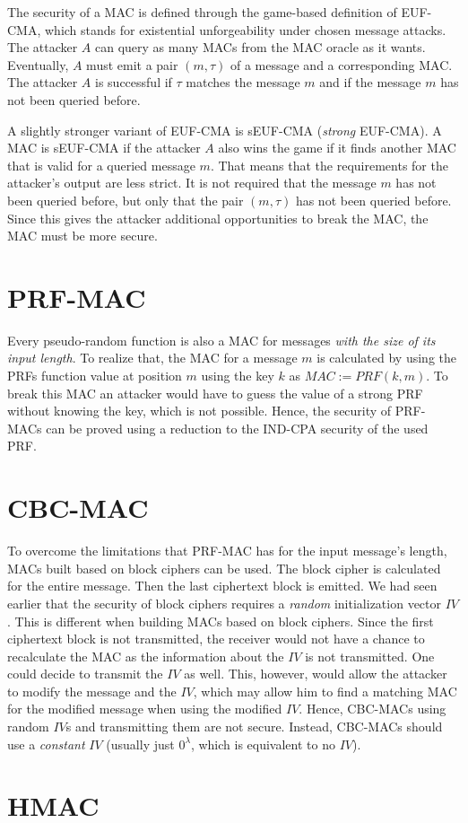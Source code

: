 The security of a \ac{MAC} is defined through the game-based definition of EUF-CMA, which stands for existential unforgeability under chosen message attacks. The attacker $A$ can query as many \acp{MAC} from the \ac{MAC} oracle as it wants. Eventually, $A$ must emit a pair $(m,\tau)$ of a message and a corresponding \ac{MAC}. The attacker $A$ is successful if $\tau$ matches the message $m$ and if the message $m$ has not been queried before.

A slightly stronger variant of EUF-CMA is sEUF-CMA (\emph{strong} EUF-CMA). A \ac{MAC} is sEUF-CMA if the attacker $A$ also wins the game if it finds another \ac{MAC} that is valid for a queried message $m$. That means that the requirements for the attacker's output are less strict. It is not required that the message $m$ has not been queried before, but only that the pair $(m,\tau)$ has not been queried before. Since this gives the attacker additional opportunities to break the \ac{MAC}, the \ac{MAC} must be more secure.

\section{PRF-MAC}

Every pseudo-random function is also a MAC for messages \emph{with the size of its input length}.
To realize that, the MAC for a message $m$ is calculated by using the PRFs function value at position $m$ using the key $k$ as $MAC := PRF(k,m)$.
To break this MAC an attacker would have to guess the value of a strong PRF without knowing the key, which is not possible.
Hence, the security of PRF-MACs can be proved using a reduction to the IND-CPA security of the used PRF.

\section{CBC-MAC}

To overcome the limitations that PRF-MAC has for the input message's length, MACs built based on block ciphers can be used.
The block cipher is calculated for the entire message.
Then the last ciphertext block is emitted.
We had seen earlier that the security of block ciphers requires a \emph{random} initialization vector $IV$.
This is different when building MACs based on block ciphers.
Since the first ciphertext block is not transmitted, the receiver would not have a chance to recalculate the MAC as the information about the $IV$ is not transmitted.
One could decide to transmit the $IV$ as well. This, however, would allow the attacker to modify the message and the $IV$, which may allow him to find a matching MAC for the modified message when using the modified $IV$.
Hence, CBC-MACs using random $IV$s and transmitting them are not secure.
Instead, CBC-MACs should use a \emph{constant} $IV$ (usually just $0^\lambda$, which is equivalent to no $IV$).




\section{HMAC}
